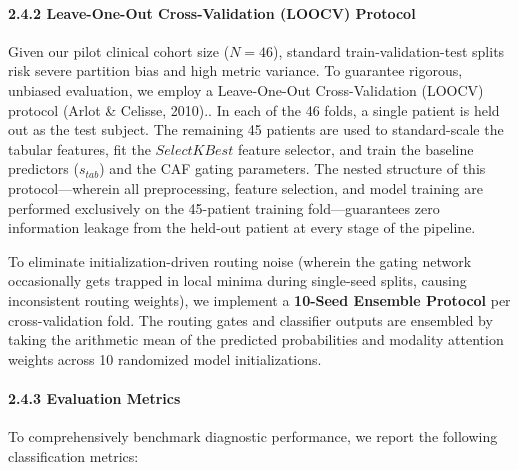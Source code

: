 \documentclass[
]{article}
\begin{document}
\paragraph{\texorpdfstring{\textbf{2.4.2 Leave-One-Out Cross-Validation
(LOOCV)
Protocol}}{2.4.2 Leave-One-Out Cross-Validation (LOOCV) Protocol}}\label{leave-one-out-cross-validation-loocv-protocol}

Given our pilot clinical cohort size (\(N = 46\)), standard
train-validation-test splits risk severe partition bias and high metric
variance. To guarantee rigorous, unbiased evaluation, we employ a
Leave-One-Out Cross-Validation (LOOCV) protocol (Arlot \& Celisse,
2010).. In each of the 46 folds, a single patient is held out as the
test subject. The remaining 45 patients are used to standard-scale the
tabular features, fit the \(SelectKBest\) feature selector, and train
the baseline predictors (\(s_{tab}\)) and the CAF gating parameters. The
nested structure of this protocol---wherein all preprocessing, feature
selection, and model training are performed exclusively on the
45-patient training fold---guarantees zero information leakage from the
held-out patient at every stage of the pipeline.

To eliminate initialization-driven routing noise (wherein the gating
network occasionally gets trapped in local minima during single-seed
splits, causing inconsistent routing weights), we implement a
\textbf{10-Seed Ensemble Protocol} per cross-validation fold. The
routing gates and classifier outputs are ensembled by taking the
arithmetic mean of the predicted probabilities and modality attention
weights across 10 randomized model initializations.

\paragraph{\texorpdfstring{\textbf{2.4.3 Evaluation
Metrics}}{2.4.3 Evaluation Metrics}}\label{evaluation-metrics}

To comprehensively benchmark diagnostic performance, we report the
following classification metrics:
\end{document}
